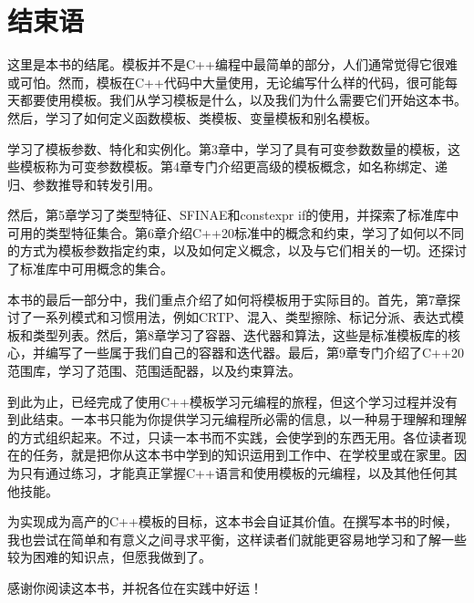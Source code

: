 \chapter{结束语}

这里是本书的结尾。模板并不是C++编程中最简单的部分，人们通常觉得它很难或可怕。然而，模板在C++代码中大量使用，无论编写什么样的代码，很可能每天都要使用模板。我们从学习模板是什么，以及我们为什么需要它们开始这本书。然后，学习了如何定义函数模板、类模板、变量模板和别名模板。

学习了模板参数、特化和实例化。第3章中，学习了具有可变参数数量的模板，这些模板称为可变参数模板。第4章专门介绍更高级的模板概念，如名称绑定、递归、参数推导和转发引用。

然后，第5章学习了类型特征、SFINAE和constexpr if的使用，并探索了标准库中可用的类型特征集合。第6章介绍C++20标准中的概念和约束，学习了如何以不同的方式为模板参数指定约束，以及如何定义概念，以及与它们相关的一切。还探讨了标准库中可用概念的集合。

本书的最后一部分中，我们重点介绍了如何将模板用于实际目的。首先，第7章探讨了一系列模式和习惯用法，例如CRTP、混入、类型擦除、标记分派、表达式模板和类型列表。然后，第8章学习了容器、迭代器和算法，这些是标准模板库的核心，并编写了一些属于我们自己的容器和迭代器。最后，第9章专门介绍了C++20范围库，学习了范围、范围适配器，以及约束算法。

到此为止，已经完成了使用C++模板学习元编程的旅程，但这个学习过程并没有到此结束。一本书只能为你提供学习元编程所必需的信息，以一种易于理解和理解的方式组织起来。不过，只读一本书而不实践，会使学到的东西无用。各位读者现在的任务，就是把你从这本书中学到的知识运用到工作中、在学校里或在家里。因为只有通过练习，才能真正掌握C++语言和使用模板的元编程，以及其他任何其他技能。

为实现成为高产的C++模板的目标，这本书会自证其价值。在撰写本书的时候，我也尝试在简单和有意义之间寻求平衡，这样读者们就能更容易地学习和了解一些较为困难的知识点，但愿我做到了。

感谢你阅读这本书，并祝各位在实践中好运！


